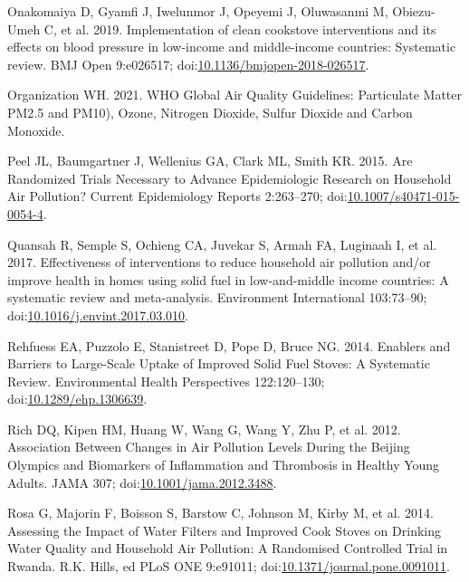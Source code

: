 \documentclass[
  letterpaper,
  DIV=11,
  numbers=noendperiod]{scrartcl}
\newlength{\cslhangindent}
\newlength{\cslentryspacingunit} %
\newenvironment{CSLReferences}[2] %
 {%
  \setlength{\parindent}{0pt}
  \ifodd #1
  \let\oldpar\par
  \def\par{\hangindent=\cslhangindent\oldpar}
  \fi
  \setlength{\parskip}{#2\cslentryspacingunit}
 }%
 {}
\begin{document}
\begin{CSLReferences}{1}{0}
\leavevmode{}%
Onakomaiya D, Gyamfi J, Iwelunmor J, Opeyemi J, Oluwasanmi M,
Obiezu-Umeh C, et al. 2019. Implementation of clean cookstove
interventions and its effects on blood pressure in low-income and
middle-income countries: Systematic review. BMJ Open 9:e026517;
doi:\href{https://doi.org/10.1136/bmjopen-2018-026517}{10.1136/bmjopen-2018-026517}.

\leavevmode{}%
Organization WH. 2021. {WHO Global Air Quality Guidelines}: {Particulate
Matter PM2}.5 and {PM10}), {Ozone}, {Nitrogen Dioxide}, {Sulfur Dioxide}
and {Carbon Monoxide}.

\leavevmode{}%
Peel JL, Baumgartner J, Wellenius GA, Clark ML, Smith KR. 2015. Are
{Randomized Trials Necessary} to {Advance Epidemiologic Research} on
{Household Air Pollution}? Current Epidemiology Reports 2:263--270;
doi:\href{https://doi.org/10.1007/s40471-015-0054-4}{10.1007/s40471-015-0054-4}.

\leavevmode{}%
Quansah R, Semple S, Ochieng CA, Juvekar S, Armah FA, Luginaah I, et al.
2017. Effectiveness of interventions to reduce household air pollution
and/or improve health in homes using solid fuel in low-and-middle income
countries: {A} systematic review and meta-analysis. Environment
International 103:73--90;
doi:\href{https://doi.org/10.1016/j.envint.2017.03.010}{10.1016/j.envint.2017.03.010}.

\leavevmode{}%
Rehfuess EA, Puzzolo E, Stanistreet D, Pope D, Bruce NG. 2014. Enablers
and {Barriers} to {Large-Scale Uptake} of {Improved Solid Fuel Stoves}:
{A Systematic Review}. Environmental Health Perspectives 122:120--130;
doi:\href{https://doi.org/10.1289/ehp.1306639}{10.1289/ehp.1306639}.

\leavevmode{}%
Rich DQ, Kipen HM, Huang W, Wang G, Wang Y, Zhu P, et al. 2012.
Association {Between Changes} in {Air Pollution Levels During} the
{Beijing Olympics} and {Biomarkers} of {Inflammation} and {Thrombosis}
in {Healthy Young Adults}. JAMA 307;
doi:\href{https://doi.org/10.1001/jama.2012.3488}{10.1001/jama.2012.3488}.

\leavevmode{}%
Rosa G, Majorin F, Boisson S, Barstow C, Johnson M, Kirby M, et al.
2014. Assessing the {Impact} of {Water Filters} and {Improved Cook
Stoves} on {Drinking Water Quality} and {Household Air Pollution}: {A
Randomised Controlled Trial} in {Rwanda}. R.K. Hills, ed PLoS ONE
9:e91011;
doi:\href{https://doi.org/10.1371/journal.pone.0091011}{10.1371/journal.pone.0091011}.


\end{CSLReferences}
\end{document}
